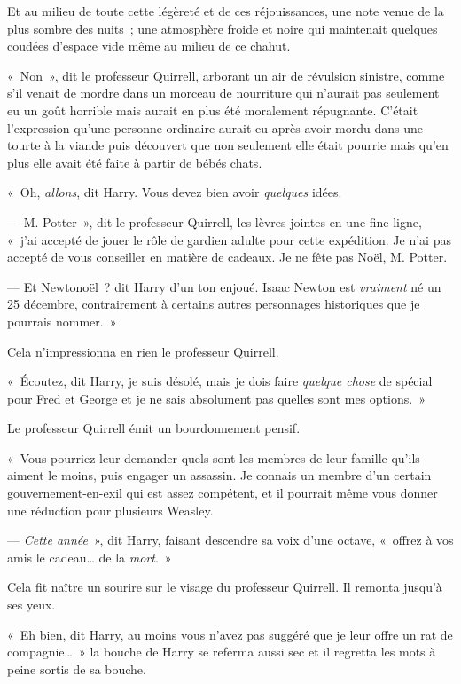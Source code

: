 Et au milieu de toute cette légèreté et de ces réjouissances, une note venue de la plus sombre des nuits~; une atmosphère froide et noire qui maintenait quelques coudées d'espace vide même au milieu de ce chahut.

«~Non~», dit le professeur Quirrell, arborant un air de révulsion sinistre, comme s'il venait de mordre dans un morceau de nourriture qui n'aurait pas seulement eu un goût horrible mais aurait en plus été moralement répugnante. C'était l'expression qu'une personne ordinaire aurait eu après avoir mordu dans une tourte à la viande puis découvert que non seulement elle était pourrie mais qu'en plus elle avait été faite à partir de bébés chats.

«~Oh, \emph{allons}, dit Harry. Vous devez bien avoir \emph{quelques} idées.

--- M. Potter~», dit le professeur Quirrell, les lèvres jointes en une fine ligne, «~j'ai accepté de jouer le rôle de gardien adulte pour cette expédition. Je n'ai pas accepté de vous conseiller en matière de cadeaux. Je ne fête pas Noël, M. Potter.

--- Et Newtonoël~? dit Harry d'un ton enjoué. Isaac Newton est \emph{vraiment} né un 25 décembre, contrairement à certains autres personnages historiques que je pourrais nommer.~»

Cela n'impressionna en rien le professeur Quirrell.

«~Écoutez, dit Harry, je suis désolé, mais je dois faire \emph{quelque chose} de spécial pour Fred et George et je ne sais absolument pas quelles sont mes options.~»

Le professeur Quirrell émit un bourdonnement pensif.

«~Vous pourriez leur demander quels sont les membres de leur famille qu'ils aiment le moins, puis engager un assassin. Je connais un membre d'un certain gouvernement-en-exil qui est assez compétent, et il pourrait même vous donner une réduction pour plusieurs Weasley.

--- \emph{Cette année}~», dit Harry, faisant descendre sa voix d'une octave, «~offrez à vos amis le cadeau… de la \emph{mort}.~»

Cela fit naître un sourire sur le visage du professeur Quirrell. Il remonta jusqu'à ses yeux.

«~Eh bien, dit Harry, au moins vous n'avez pas suggéré que je leur offre un rat de compagnie…~» la bouche de Harry se referma aussi sec et il regretta les mots à peine sortis de sa bouche.

